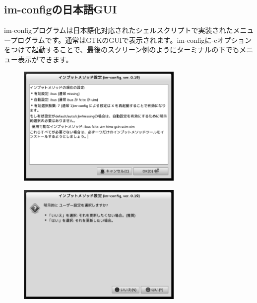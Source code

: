 \documentclass[mingoth,a4paper]{jsarticle}
\begin{document}
\subsection{im-configの日本語GUI}
im-configプログラムは日本語化対応されたシェルスクリプトで実装されたメニュープログラムです。通常はGTKのGUIで表示されます。im-configに-cオプションをつけて起動することで、最後のスクリーン例のようにターミナルの下でもメニュー表示ができます。
\begin{figure}[htbp]
 \begin{minipage}{0.5\hsize}
  \begin{center}
   \includegraphics[width=8cm]{image201212/im04_mono.png}
  \end{center}
  \label{fig:one}
 \end{minipage}
 \begin{minipage}{0.5\hsize}
  \begin{center}
   \includegraphics[width=8cm]{image201212/im05_mono.png}
  \end{center}
  \label{fig:two}
 \end{minipage}
\end{figure}
\end{document}
